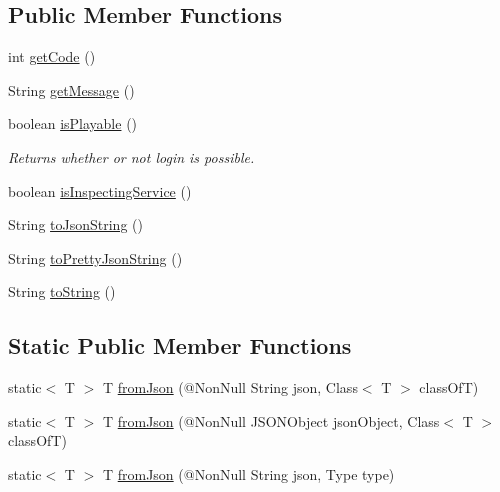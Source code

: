 \subsection*{Public Member Functions}
\begin{DoxyCompactItemize}
\item 
int \hyperlink{classcom_1_1toast_1_1android_1_1gamebase_1_1launching_1_1data_1_1_launching_status_a8361b009dd85dd991e5e684d648ffabf}{get\+Code} ()
\item 
String \hyperlink{classcom_1_1toast_1_1android_1_1gamebase_1_1launching_1_1data_1_1_launching_status_afafd068b736520af1e24269a284980a9}{get\+Message} ()
\item 
boolean \hyperlink{classcom_1_1toast_1_1android_1_1gamebase_1_1launching_1_1data_1_1_launching_status_a4e7246a0ecb5d31951a58d042ad07cb7}{is\+Playable} ()
\begin{DoxyCompactList}\small\item\em Returns whether or not login is possible. \end{DoxyCompactList}\item 
boolean \hyperlink{classcom_1_1toast_1_1android_1_1gamebase_1_1launching_1_1data_1_1_launching_status_a4504b00719249ab86e92261b61e6ef75}{is\+Inspecting\+Service} ()
\item 
String \hyperlink{classcom_1_1toast_1_1android_1_1gamebase_1_1base_1_1_value_object_a58acf6402880e9769d79d8667581fa6a}{to\+Json\+String} ()
\item 
String \hyperlink{classcom_1_1toast_1_1android_1_1gamebase_1_1base_1_1_value_object_a054431f3d988a22295cfc8b784ff2637}{to\+Pretty\+Json\+String} ()
\item 
String \hyperlink{classcom_1_1toast_1_1android_1_1gamebase_1_1base_1_1_value_object_ad146fa8579a5f8a876c4688cc5a68520}{to\+String} ()
\end{DoxyCompactItemize}
\subsection*{Static Public Member Functions}
\begin{DoxyCompactItemize}
\item 
static$<$ T $>$ T \hyperlink{classcom_1_1toast_1_1android_1_1gamebase_1_1base_1_1_value_object_ae6655c88c20a9a8406dc11b46250ac7b}{from\+Json} (@Non\+Null String json, Class$<$ T $>$ class\+OfT)
\item 
static$<$ T $>$ T \hyperlink{classcom_1_1toast_1_1android_1_1gamebase_1_1base_1_1_value_object_ab83c4196ee2e3f11553bbe0f04dc2101}{from\+Json} (@Non\+Null J\+S\+O\+N\+Object json\+Object, Class$<$ T $>$ class\+OfT)
\item 
static$<$ T $>$ T \hyperlink{classcom_1_1toast_1_1android_1_1gamebase_1_1base_1_1_value_object_aa901d97d495150b54bcb80c05672f58a}{from\+Json} (@Non\+Null String json, Type type)
\end{DoxyCompactItemize}

